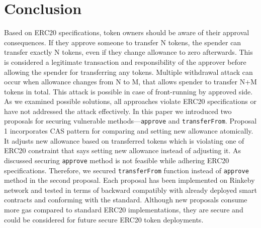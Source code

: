 
\section{Conclusion}

Based on ERC20 specifications, token owners should be aware of their approval consequences. If they approve someone to transfer N tokens, the spender can transfer exactly N tokens, even if they change allowance to zero afterwards. This is considered a legitimate transaction and responsibility of the approver before allowing the spender for transferring any tokens. Multiple withdrawal attack can occur when allowance changes from N to M, that allows spender to transfer N+M tokens in total. This attack is possible in case of front-running by approved side. As we examined possible solutions, all approaches violate ERC20 specifications or have not addressed the attack effectively. In this paper we introduced two proposals for securing vulnerable methods---\texttt{approve} and \texttt{transferFrom}. Proposal 1 incorporates CAS pattern for comparing and setting new allowance atomically. It adjusts new allowance based on transferred tokens which is violating one of ERC20 constraint that says setting new allowance instead of adjusting it. As discussed securing \texttt{approve} method is not feasible while adhering ERC20 specifications. Therefore, we secured \texttt{transferFrom} function instead of \texttt{approve} method in the second proposal. Each proposal has been implemented on Rinkeby network and tested in terms of backward compatibly with already deployed smart contracts and conforming with the standard. Although new proposals consume more gas compared to standard ERC20 implementations, they are secure and could be considered for future secure ERC20 token deployments.